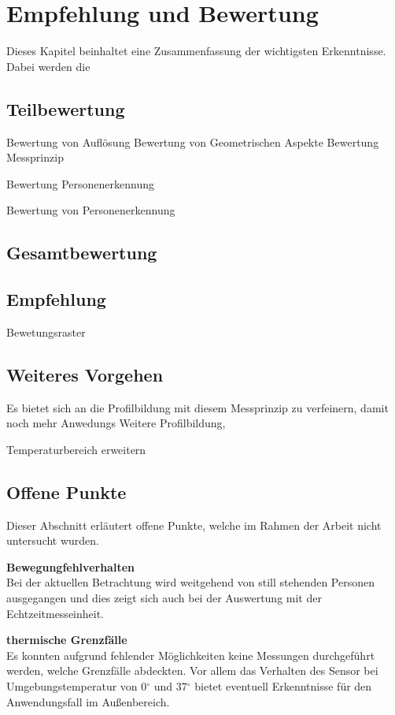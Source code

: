 \chapter{Empfehlung und Bewertung}
\label{Empfehlung_Vorgehen}

Dieses Kapitel beinhaltet eine Zusammenfassung der wichtigsten Erkenntnisse. Dabei werden die 

\section{Teilbewertung}


Bewertung von Auflösung
Bewertung von Geometrischen Aspekte
Bewertung Messprinzip

Bewertung Personenerkennung

Bewertung von Personenerkennung

\section{Gesamtbewertung}
\label{Fazit}


\section{Empfehlung}
\label{sec:Empfehlung}

Bewetungsraster


\section{Weiteres Vorgehen}

Es bietet sich an die Profilbildung mit diesem Messprinzip zu verfeinern, damit noch mehr Anwedungs
Weitere Profilbildung, 

Temperaturbereich erweitern

\section{Offene Punkte}

Dieser Abschnitt erläutert offene Punkte, welche im Rahmen der Arbeit nicht untersucht wurden.

\textbf{Bewegungfehlverhalten}\\
Bei der aktuellen Betrachtung wird weitgehend von still stehenden Personen ausgegangen und dies zeigt sich auch bei der Auswertung mit der Echtzeitmesseinheit. 


\textbf{thermische Grenzfälle}\\
Es konnten aufgrund fehlender Möglichkeiten keine Messungen durchgeführt werden, welche Grenzfälle abdeckten. Vor allem das Verhalten des Sensor bei Umgebungstemperatur von 0$^\circ$ und 37$^\circ$ bietet eventuell Erkenntnisse für den Anwendungsfall im Außenbereich.

